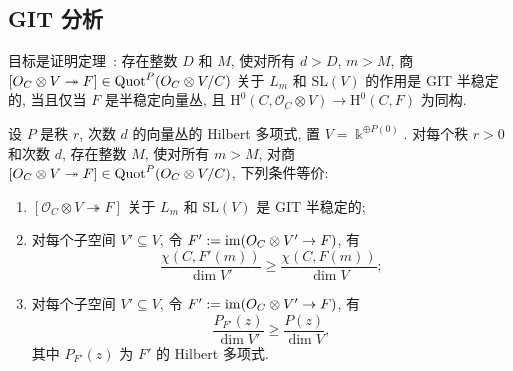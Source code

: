 \subsection{GIT 分析}\label{src:9.5.3-subsection}
目标是证明定理~: 存在整数 $D$ 和 $M$, 使对所有 $d>D$, $m>M$, 商 $[O_C\otimes V\twoheadrightarrow F]\in\operatorname{Quot}^P(O_C\otimes V/C)$ 关于 $L_m$ 和 $\mathrm{SL}(V)$ 的作用是 GIT 半稳定的, 当且仅当 $F$ 是半稳定向量丛, 且 $\mathrm H^0(C,\mathcal O_C\otimes V)\to\mathrm H^0(C,F)$ 为同构.
\begin{proposition}\label{src:9.5.12}
设 $P$ 是秩 $r$, 次数 $d$ 的向量丛的 Hilbert 多项式, 置 $V=\Bbbk^{\oplus P(0)}$. 对每个秩 $r>0$ 和次数 $d$, 存在整数 $M$, 使对所有 $m>M$, 对商 $[O_C\otimes V\twoheadrightarrow F]\in\operatorname{Quot}^P(O_C\otimes V/C)$, 下列条件等价:
\begin{enumerate}[(1)]
\item $[\mathcal O_C\otimes V\twoheadrightarrow F]$ 关于 $L_m$ 和 $\mathrm{SL}(V)$ 是 GIT 半稳定的;
\item 对每个子空间 $V'\subseteq V$, 令 $F':=\operatorname{im}(O_C\otimes V'\to F)$, 有
\begin{equation}\label{src:9.5.13}
\frac{\chi(C,F'(m))}{\dim V'}\geq\frac{\chi(C,F(m))}{\dim V};
\end{equation}
\item[(2$'$)] 对每个子空间 $V'\subseteq V$, 令 $F':=\operatorname{im}(O_C\otimes V'\to F)$, 有
\[
\frac{P_{F'}(z)}{\dim V'}\geq\frac{P(z)}{\dim V},
\]
其中 $P_{F'}(z)$ 为 $F'$ 的 Hilbert 多项式.
\end{enumerate}
\end{proposition}
